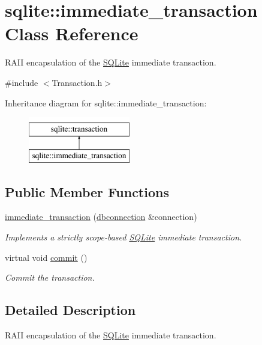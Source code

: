 \hypertarget{a00008}{\section{sqlite\-:\-:immediate\-\_\-transaction Class Reference}
\label{a00008}
}


R\-A\-I\-I encapsulation of the \hyperlink{a00038}{S\-Q\-Lite} immediate transaction.  




{\ttfamily \#include $<$Transaction.\-h$>$}

Inheritance diagram for sqlite\-:\-:immediate\-\_\-transaction\-:\begin{figure}[H]
\begin{center}
\leavevmode
\includegraphics[height=2.000000cm]{a00008}
\end{center}
\end{figure}
\subsection*{Public Member Functions}
\begin{DoxyCompactItemize}
\item 
\hyperlink{a00008_a17924d6e15666b8340ee8aab9a88e0d1}{immediate\-\_\-transaction} (\hyperlink{a00004}{dbconnection} \&connection)
\begin{DoxyCompactList}\small\item\em Implements a strictly scope-\/based \hyperlink{a00038}{S\-Q\-Lite} immediate transaction. \end{DoxyCompactList}\item 
\hypertarget{a00014_abe219dd0bf949d569381f9830c7b2d1a}{virtual void \hyperlink{a00014_abe219dd0bf949d569381f9830c7b2d1a}{commit} ()}\label{a00014_abe219dd0bf949d569381f9830c7b2d1a}

\begin{DoxyCompactList}\small\item\em Commit the transaction. \end{DoxyCompactList}\end{DoxyCompactItemize}


\subsection{Detailed Description}
R\-A\-I\-I encapsulation of the \hyperlink{a00038}{S\-Q\-Lite} immediate transaction. 

